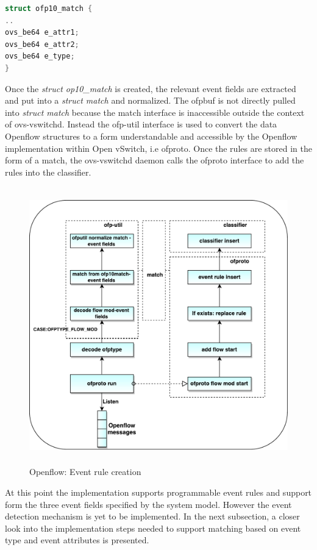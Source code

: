 \begin{lstlisting}[language=c]
struct ofp10_match {
..
ovs_be64 e_attr1;
ovs_be64 e_attr2;
ovs_be64 e_type;
}
\end{lstlisting}

Once the \textit{struct op10_match} is created, the relevant event fields are extracted and put into a \textit{struct match} and normalized. The ofpbuf is not directly pulled into \textit{struct match} because the match interface is inaccessible outside the context of ovs-vswitchd. Instead the ofp-util interface is used to convert the data Openflow structures to a form understandable and accessible by the Openflow implementation within Open vSwitch, i.e ofproto. Once the rules are stored in the form of a match, the ovs-vswitchd daemon calls the ofproto interface to add the rules into the classifier.

\begin{figure}[H]
	\centering
	\caption{Openflow: Event rule creation}
	\includegraphics[height=12cm,width=14cm]{ruleinsert.pdf}
\end{figure}

At this point the implementation supports programmable event rules and support form the three event fields specified by the system model. However the event detection mechanism is yet to be implemented. In the next subsection, a closer look into the implementation steps needed to support matching based on event type and event attributes is presented.


